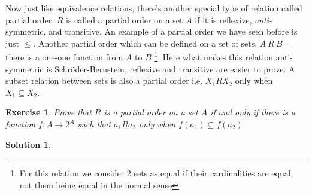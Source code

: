 \documentclass[a4paper,10pt]{article}
\newtheorem{exercise}{Exercise}[section]
\theoremstyle{definition} %
\newtheorem*{solution}{Solution}
\begin{document}
    Now just like equivalence relations, there's another special type of relation
    called partial order. $R$ is called a partial order on a set $A$ if it is reflexive,
    \emph{anti-}symmetric, and transitive. An example of a partial order we have seen 
    before is just $\leq$. Another partial order which can be defined on a set of sets. 
    $A \ R \ B = $ there is a one-one function from $A$ to $B$ \footnote{For this relation
    we consider 2 sets as equal if their cardinalities are equal, not them being equal
    in the normal sense}. Here what makes this relation anti-symmetric is Schr\"{o}der-Bernstein,
    reflexive and transitive are easier to prove. A subset relation between sets is also
    a partial order i.e. $X_1RX_2$ only when $X_1 \subseteq X_2$.

    \begin{exercise}
        Prove that $R$ is a partial order on a set $A$ if and only if there is a function $f: 
        A \rightarrow 2^A$ such that $a_1Ra_2$ only when $f(a_1) \subseteq f(a_2)$
    \end{exercise}

    \begin{solution}
        
    \end{solution}
\end{document}
